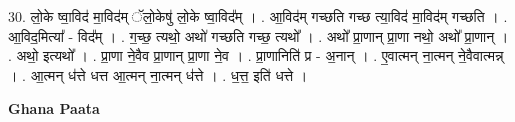 \documentclass[17pt]{extarticle}
\begin{document}
30. लो॒के ष्वा॒विद॑ मा॒विद॑म् ॅलो॒केषु॑ लो॒के ष्वा॒विद᳚म् । . आ॒विद॑म् गच्छति गच्छ त्या॒विद॑ मा॒विद॑म् गच्छति । . आ॒विद॒मित्या᳚ - विद᳚म् । . ग॒च्छ॒ त्यथो॒ अथो॑ गच्छति गच्छ॒ त्यथो᳚ । . अथो᳚ प्रा॒णान् प्रा॒णा नथो॒ अथो᳚ प्रा॒णान् । . अथो॒ इत्यथो᳚ । . प्रा॒णा ने॒वैव प्रा॒णान् प्रा॒णा ने॒व । . प्रा॒णानिति॑ प्र - अ॒नान् । . ए॒वात्मन् ना॒त्मन् ने॒वैवात्मन्न् । . आ॒त्मन् ध॑त्ते धत्त आ॒त्मन् ना॒त्मन् ध॑त्ते । . ध॒त्त॒ इति॑ धत्ते । \newline

\textbf{Ghana Paata } \newline
\end{document}
